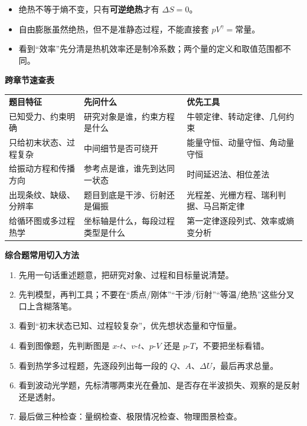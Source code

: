 \documentclass[lang=cn,11pt]{elegantbook}
\begin{document}
\begin{itemize}
  \item 绝热不等于熵不变，只有\textbf{可逆绝热}才有 \(\Delta S=0\)。
  \item 自由膨胀虽然绝热，但不是准静态过程，不能直接套 \(pV^\gamma=\text{常量}\)。
  \item 看到“效率”先分清是热机效率还是制冷系数；两个量的定义和取值范围都不同。
\end{itemize}

\textbf{跨章节速查表}

\begin{center}
\renewcommand{\arraystretch}{1.2}
\begin{tabular}{>{\raggedright\arraybackslash}p{} >{\raggedright\arraybackslash}p{} >{\raggedright\arraybackslash}p{}}
\textbf{题目特征} & \textbf{先问什么} & \textbf{优先工具} \\
已知受力、约束明确 & 研究对象是谁，约束方程是什么 & 牛顿定律、转动定律、几何约束 \\
只给初末状态、过程复杂 & 中间细节是否可绕开 & 能量守恒、动量守恒、角动量守恒 \\
给振动方程和传播方向 & 参考点是谁，谁先到达同一状态 & 时间延迟法、相位差法 \\
出现条纹、缺级、分辨率 & 题目到底是干涉、衍射还是偏振 & 光程差、光栅方程、瑞利判据、马吕斯定律 \\
给循环图或多过程热学 & 坐标轴是什么，每段过程类型是什么 & 第一定律逐段列式、效率或熵变分析 \\
\end{tabular}
\end{center}

\textbf{综合题常用切入方法}

\begin{enumerate}
  \item 先用一句话重述题意，把研究对象、过程和目标量说清楚。
  \item 先判模型，再判工具；不要在“质点/刚体”“干涉/衍射”“等温/绝热”这些分叉口上含糊落笔。
  \item 看到“初末状态已知、过程较复杂”，优先想状态量和守恒量。
  \item 看到图像题，先判断图是 \(x\)-\(t\)、\(v\)-\(t\)、\(p\)-\(V\) 还是 \(p\)-\(T\)，不要把坐标看错。
  \item 看到热学多过程题，先逐段列出每一段的 \(Q\)、\(A\)、\(\Delta U\)，最后再求总量。
  \item 看到波动光学题，先标清哪两束光在叠加、是否存在半波损失、观察的是反射还是透射。
  \item 最后做三种检查：量纲检查、极限情况检查、物理图景检查。
\end{enumerate}
\end{document}
